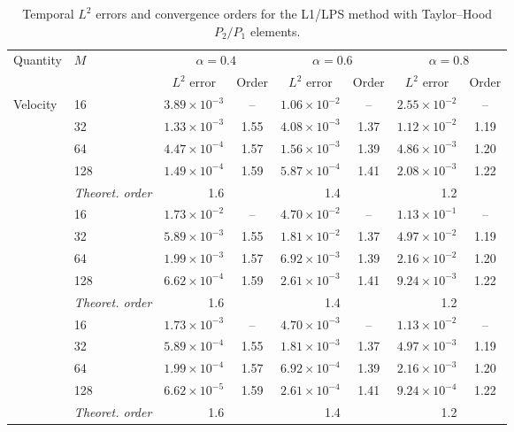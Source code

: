 \documentclass[11pt,a4paper]{article}
\numberwithin{equation}{section}
\renewcommand{\arraystretch}{1.25}
\theoremstyle{plain}
\theoremstyle{definition}
\theoremstyle{remark}
\begin{document}
\begin{table}[htbp]
\centering
\caption{Temporal $L^2$ errors and convergence orders for the L1/LPS
method with Taylor--Hood $P_2/P_1$ elements.}
\label{tab:ex1-time-lps}
\setlength{\tabcolsep}{6pt}
\renewcommand{\arraystretch}{1.15}
\begin{tabular}{llcc|cc|cc}
\toprule
\multirow{2}{*}{Quantity} & \multirow{2}{*}{$M$}
& \multicolumn{2}{c|}{$\alpha=0.4$}
& \multicolumn{2}{c|}{$\alpha=0.6$}
& \multicolumn{2}{c}{$\alpha=0.8$} \\
\cmidrule(lr){3-4}
\cmidrule(lr){5-6}
\cmidrule(l){7-8}
& & $L^2$ error & Order
  & $L^2$ error & Order
  & $L^2$ error & Order \\
\midrule

\multirow{5}{*}{Velocity}
& 16  & $3.89\times10^{-3}$ & --   & $1.06\times10^{-2}$ & --   & $2.55\times10^{-2}$ & --   \\
& 32  & $1.33\times10^{-3}$ & 1.55 & $4.08\times10^{-3}$ & 1.37 & $1.12\times10^{-2}$ & 1.19 \\
& 64  & $4.47\times10^{-4}$ & 1.57 & $1.56\times10^{-3}$ & 1.39 & $4.86\times10^{-3}$ & 1.20 \\
& 128 & $1.49\times10^{-4}$ & 1.59 & $5.87\times10^{-4}$ & 1.41 & $2.08\times10^{-3}$ & 1.22 \\
& \textit{Theoret. order}
& \multicolumn{2}{c|}{1.6}
& \multicolumn{2}{c|}{1.4}
& \multicolumn{2}{c}{1.2} \\

\addlinespace
\multirow{5}{*}{Stress}
& 16  & $1.73\times10^{-2}$ & --   & $4.70\times10^{-2}$ & --   & $1.13\times10^{-1}$ & --   \\
& 32  & $5.89\times10^{-3}$ & 1.55 & $1.81\times10^{-2}$ & 1.37 & $4.97\times10^{-2}$ & 1.19 \\
& 64  & $1.99\times10^{-3}$ & 1.57 & $6.92\times10^{-3}$ & 1.39 & $2.16\times10^{-2}$ & 1.20 \\
& 128 & $6.62\times10^{-4}$ & 1.59 & $2.61\times10^{-3}$ & 1.41 & $9.24\times10^{-3}$ & 1.22 \\
& \textit{Theoret. order}
& \multicolumn{2}{c|}{1.6}
& \multicolumn{2}{c|}{1.4}
& \multicolumn{2}{c}{1.2} \\

\addlinespace
\multirow{5}{*}{Energy norm}
& 16  & $1.73\times10^{-3}$ & --   & $4.70\times10^{-3}$ & --   & $1.13\times10^{-2}$ & --   \\
& 32  & $5.89\times10^{-4}$ & 1.55 & $1.81\times10^{-3}$ & 1.37 & $4.97\times10^{-3}$ & 1.19 \\
& 64  & $1.99\times10^{-4}$ & 1.57 & $6.92\times10^{-4}$ & 1.39 & $2.16\times10^{-3}$ & 1.20 \\
& 128 & $6.62\times10^{-5}$ & 1.59 & $2.61\times10^{-4}$ & 1.41 & $9.24\times10^{-4}$ & 1.22 \\
& \textit{Theoret. order}
& \multicolumn{2}{c|}{1.6}
& \multicolumn{2}{c|}{1.4}
& \multicolumn{2}{c}{1.2} \\


\end{tabular}
\end{table}
\end{document}
